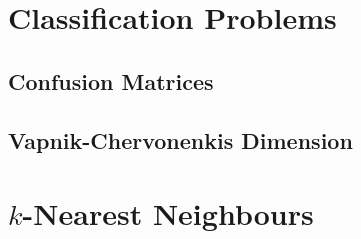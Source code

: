 \documentclass[11pt]{report} %
\begin{document}
\section{Classification Problems}

\subsection{Confusion Matrices}

\subsection{Vapnik-Chervonenkis Dimension}

\section{$k$-Nearest Neighbours}
\end{document}
